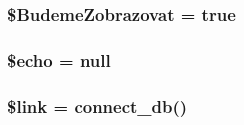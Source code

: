 \subsubsection{\setlength{\rightskip}{0pt plus 5cm}\$BudemeZobrazovat = true}\label{edit__user_8php_7257dc22059027fb436043d05c4adc71}


\subsubsection{\setlength{\rightskip}{0pt plus 5cm}\$echo = null}\label{edit__user_8php_76dbdd763137ce9b516dc94d3a16fe60}


\subsubsection{\setlength{\rightskip}{0pt plus 5cm}\$link = connect\_\-db()}\label{edit__user_8php_5d346e31b75d916e3bac9cb193bfc97f}


